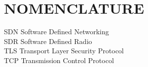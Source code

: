 %
%
%

\setlength\parindent{0pt}
\newcommand\tab[1][1cm]{\hspace*{#1}}
\chapter*{NOMENCLATURE}

SDN\tab[2cm] Software Defined Networking \\
SDR\tab[2cm] Software Defined Radio \\
TLS\tab[2cm] Transport Layer Security Protocol \\
TCP\tab[2cm] Transmission Control Protocol \\

\vspace{2em}


\pagebreak{}
